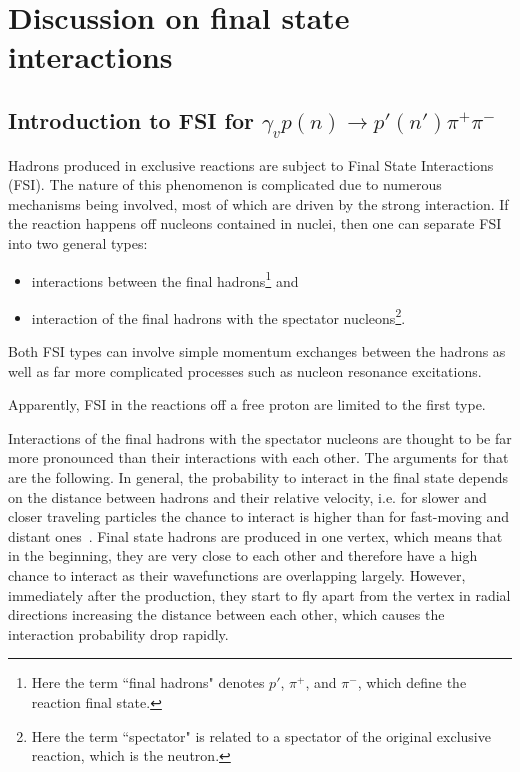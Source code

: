 \chapter{Discussion on final state interactions}
\label{Sect:fsi_discuss}

  

\section{Introduction to FSI for $\gamma_{v}p(n) \rightarrow p' (n')\pi^{+}\pi^{-}$}
\label{Sect:intro_fsi}



Hadrons produced in exclusive reactions are subject to Final State Interactions (FSI). The nature of this phenomenon is complicated due to numerous mechanisms being involved, most of which are driven by the strong interaction. If the reaction happens off nucleons contained in nuclei, then one can separate FSI into two general types:

\begin{itemize}%
\item interactions between the final hadrons\footnote[1]{Here the term ``final hadrons" denotes $p'$, $\pi^{+}$, and $\pi^{-}$, which define the reaction final state.} and%
\item interaction of the final hadrons with the spectator nucleons\footnote[2]{Here the term ``spectator" is related to a spectator of the original exclusive reaction, which is the neutron.}.%
\end{itemize}


Both FSI types can involve simple momentum exchanges between the hadrons as well as far more complicated processes such as nucleon resonance excitations.

Apparently, FSI in the reactions off a free proton are limited to the first type.

Interactions of the final hadrons with the spectator nucleons are thought to be far more pronounced than their interactions with each other. The arguments for that are the following. In general, the probability to interact in the final state depends on the distance between hadrons and their relative velocity, i.e. for slower and closer traveling particles the chance to interact is higher than for fast-moving and distant ones~\cite{Shirokov_Yudin:1980}. Final state hadrons are produced in one vertex, which means that in the beginning, they are very close to each other and therefore have a high chance to interact as their wavefunctions are overlapping largely. However, immediately after the production, they start to fly apart from the vertex in radial directions increasing the distance between each other, which causes the interaction probability drop rapidly.



